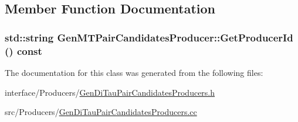 \subsection{Member Function Documentation}
\hypertarget{classGenMTPairCandidatesProducer_aa03cab7fc5713159a11b0487d3c22108}{
\subsubsection[{GetProducerId}]{\setlength{\rightskip}{0pt plus 5cm}std::string GenMTPairCandidatesProducer::GetProducerId () const}}
\label{classGenMTPairCandidatesProducer_aa03cab7fc5713159a11b0487d3c22108}


The documentation for this class was generated from the following files:\begin{DoxyCompactItemize}
\item 
interface/Producers/\hyperlink{GenDiTauPairCandidatesProducers_8h}{GenDiTauPairCandidatesProducers.h}\item 
src/Producers/\hyperlink{GenDiTauPairCandidatesProducers_8cc}{GenDiTauPairCandidatesProducers.cc}\end{DoxyCompactItemize}

